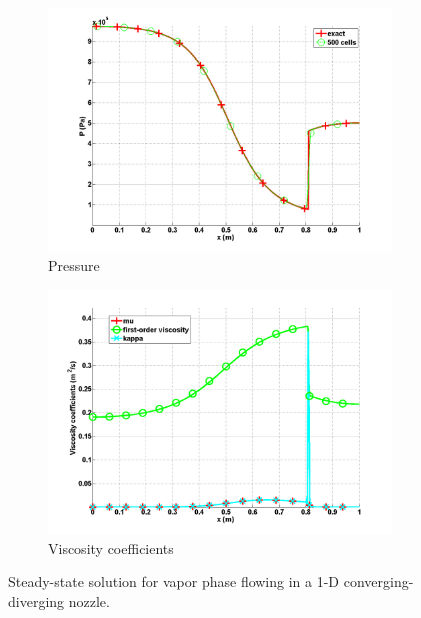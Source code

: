 \documentclass[review,10pt]{elsarticle}
\begin{document}
\begin{figure}[H]
        \begin{subfigure}[b]{0.495\textwidth}
                \centering
                \includegraphics[width=\textwidth]{figures/vapor_pressure_numerical_and_exact_500.png}
                \caption{Pressure}
                \label{fig:1d_nozzle_vap_press}
        \end{subfigure}
        \begin{subfigure}[b]{0.495\textwidth}
                \centering
                \includegraphics[width=\textwidth]{figures/vapor_viscosity_numerical_500.png}
                \caption{Viscosity coefficients}
                \label{fig:1d_nozzle_vap_visc}
        \end{subfigure}
        \caption{Steady-state solution for vapor phase flowing in a 1-D converging-diverging nozzle.}
				\label{fig:1d_vap_nozzle}
\end{figure}
\end{document}
